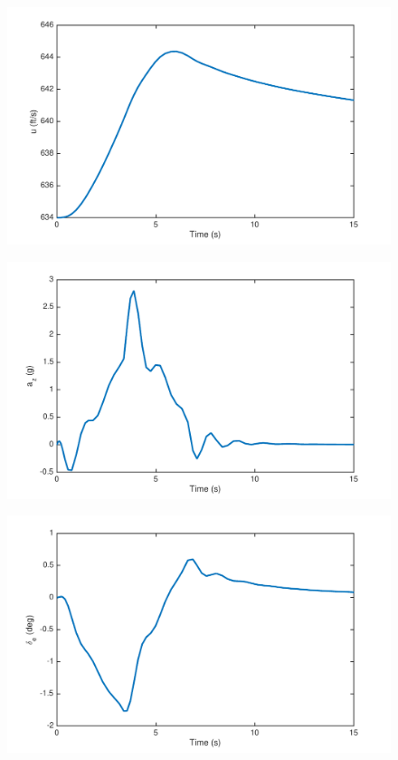 \documentclass[12pt]{article}
\begin{document}
\begin{figure}[h]
\begin{center}
\includegraphics[width=1\textwidth]{figures/u}
\end{center}
\end{figure}

\begin{figure}[h]
\begin{center}
\includegraphics[width=1\textwidth]{figures/a_z}
\end{center}
\end{figure}

\begin{figure}[h]
\begin{center}
\includegraphics[width=1\textwidth]{figures/delta_e}
\end{center}
\end{figure}
\end{document}
